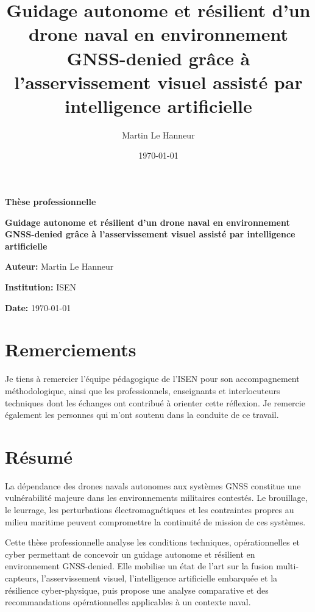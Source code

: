 \documentclass[12pt, a4paper, twoside, openright]{report}
\title{Guidage autonome et résilient d'un drone naval en environnement GNSS-denied grâce à l'asservissement visuel assisté par intelligence artificielle}
\author{Martin Le Hanneur}
\date{\today}
\begin{document}
\begin{titlepage}
    \begin{center}
        \vspace*{\fill}
        
        {\Huge \textbf{Thèse professionnelle} \par}
        \vspace{1.5cm}
        
        {\LARGE \textbf{Guidage autonome et résilient d'un drone naval en environnement GNSS-denied grâce à l'asservissement visuel assisté par intelligence artificielle} \par}
        
        \vspace{2cm}
        
        {\Large \textbf{Auteur:} Martin Le Hanneur \par}
        \vspace{0.5cm}
        {\large \textbf{Institution:} ISEN \par}
        {\large \textbf{Date:} \today \par}
        
        \vspace*{\fill}
    \end{center}
\end{titlepage}
\chapter*{Remerciements}
Je tiens à remercier l'équipe pédagogique de l'ISEN pour son accompagnement méthodologique, ainsi que les professionnels, enseignants et interlocuteurs techniques dont les échanges ont contribué à orienter cette réflexion. Je remercie également les personnes qui m'ont soutenu dans la conduite de ce travail.

\chapter*{Résumé}

La dépendance des drones navals autonomes aux systèmes GNSS constitue une vulnérabilité majeure dans les environnements militaires contestés. Le brouillage, le leurrage, les perturbations électromagnétiques et les contraintes propres au milieu maritime peuvent compromettre la continuité de mission de ces systèmes. 

Cette thèse professionnelle analyse les conditions techniques, opérationnelles et cyber permettant de concevoir un guidage autonome et résilient en environnement GNSS-denied. Elle mobilise un état de l'art sur la fusion multi-capteurs, l'asservissement visuel, l'intelligence artificielle embarquée et la résilience cyber-physique, puis propose une analyse comparative et des recommandations opérationnelles applicables à un contexte naval.
\end{document}
